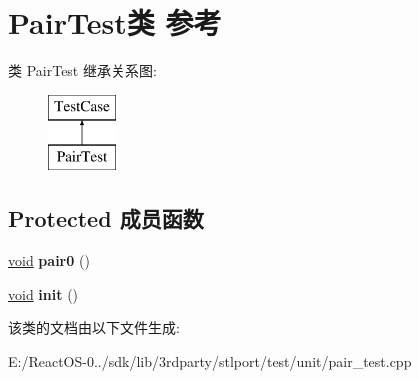 \hypertarget{class_pair_test}{}\section{Pair\+Test类 参考}
\label{class_pair_test}
类 Pair\+Test 继承关系图\+:\begin{figure}[H]
\begin{center}
\leavevmode
\includegraphics[height=2.000000cm]{class_pair_test}
\end{center}
\end{figure}
\subsection*{Protected 成员函数}
\begin{DoxyCompactItemize}
\item 
\mbox{\label{class_pair_test_a7fe5b58c3fd46056ad036d84816397e0}} 
\hyperlink{interfacevoid}{void} {\bfseries pair0} ()
\item 
\mbox{\label{class_pair_test_a6dcd6b7c7a286f83240c8f12329f0414}} 
\hyperlink{interfacevoid}{void} {\bfseries init} ()
\end{DoxyCompactItemize}


该类的文档由以下文件生成\+:\begin{DoxyCompactItemize}
\item 
E\+:/\+React\+O\+S-\/0../sdk/lib/3rdparty/stlport/test/unit/pair\+\_\+test.\+cpp\end{DoxyCompactItemize}
